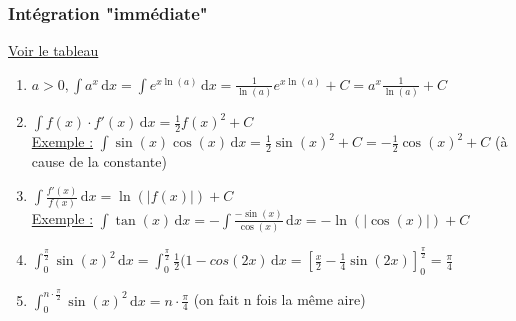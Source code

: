 \documentclass[12pt,a4paper]{article}
\newcommand{\intx}[3]{\ensuremath{\int_{#1}^{#2} #3 \, \mathrm dx}}
\begin{document}
{\subsubsection{Intégration "immédiate"}
\underline{Voir le tableau}
\begin{enumerate}
	\item $a > 0, \int a^x \, \mathrm dx = \int e^{x\ln(a)}  \, \mathrm dx = \frac{1}{\ln(a)}e^{x\ln(a)} + C = a^x\frac{1}{\ln(a)} + C$
	\item $\int f(x)\cdot f'(x)  \, \mathrm dx = \frac{1}{2}f(x)^2 + C$\\
	\underline{Exemple :} $\int \sin(x)\cos(x)  \, \mathrm dx = \frac{1}{2} \sin(x)^2 + C = -\frac{1}{2}\cos(x)^2 + C$ (à cause de la constante)
	\item $\int \frac{f'(x)}{f(x)} \, \mathrm dx = \ln(|f(x)|) + C$\\
	\underline{Exemple :} $\int \tan(x)  \, \mathrm dx = -\int \frac{-\sin(x)}{\cos(x)} \, \mathrm dx = -\ln(|\cos(x)|) + C$
	\item $\intx{0}{\frac{\pi}{2}}{\sin(x)^2} = \intx{0}{\frac{\pi}{2}}{\frac{1}{2}(1-cos(2x)} = [\frac{x}{2}-\frac{1}{4}\sin(2x)]_0^\frac{\pi}{2} = \frac{\pi}{4}$
	\item $\intx{0}{n\cdot\frac{\pi}{2}}{\sin(x)^2} = n \cdot \frac{\pi}{4}$ (on fait n fois la même aire)
\end{enumerate}\
}
\end{document}
